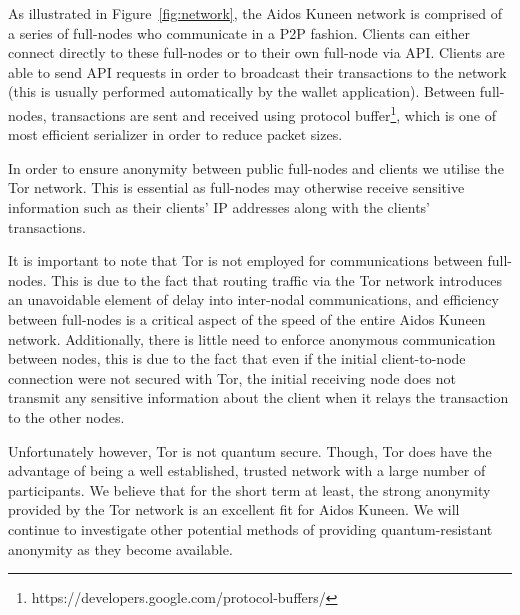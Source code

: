 \documentclass[a4paper,10pt,twocolumn]{article}
\begin{document}
	\vspace{-3.5mm}
	
	
	As illustrated in Figure~\ref{fig:network}, the Aidos Kuneen network is comprised of a series of full-nodes who communicate in a P2P fashion. 
	Clients can either connect directly to these full-nodes or to their own full-node via API\@. Clients are able to send API requests in order to broadcast their transactions to the network (this is usually performed automatically
	by the wallet application). Between full-nodes, transactions are sent and received using protocol buffer\footnote{https://developers.google.com/protocol-buffers/}, 
	which is one of most efficient serializer in order to reduce packet sizes.
	
	\vspace{2.5mm}
	
	In order to ensure anonymity between public full-nodes and clients we utilise the Tor network. This is essential as full-nodes
	may otherwise receive sensitive information such as their clients' IP addresses along with the clients' transactions.  
	
	\vspace{2.5mm}
	
	It is important to note that Tor is not employed for communications between full-nodes. This is due to the fact that routing traffic via the Tor network introduces an unavoidable element of delay into inter-nodal communications, and efficiency between full-nodes 
	is a critical aspect of the speed of the entire Aidos Kuneen network. Additionally, there is little need to enforce anonymous communication between nodes, this is due to the fact that even if the initial client-to-node connection were not secured with Tor, the initial receiving node 
	does not transmit any sensitive information about the client when it relays the transaction to the other nodes.
	
	\vspace{2.5mm}
	
	Unfortunately however, Tor is not quantum secure. Though, Tor does have the advantage of being a well established, trusted network with a large number of participants. We believe that for the short term at least, the strong anonymity provided 
	by the Tor network is an excellent fit for Aidos Kuneen. We will continue to investigate other potential methods of providing quantum-resistant anonymity as they become available. 
	
	\vspace{2.5mm}
	
\end{document}
